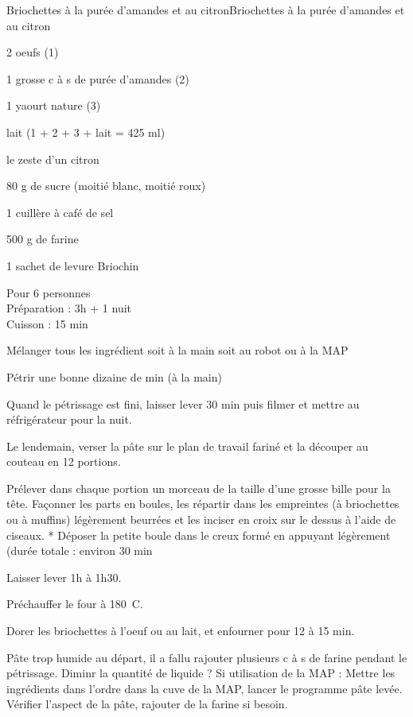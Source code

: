 \begin{recette}{Briochettes à la purée d'amandes et au citron}{Briochettes à la purée d'amandes et au citron}

\begin{ingredients}
2 oeufs (1)\par
1 grosse c à s de purée d'amandes (2)\par
1 yaourt nature (3)\par
lait (1 + 2 + 3 + lait = 425 ml)\par
le zeste d'un citron\par
80 g de sucre (moitié blanc, moitié roux)\par
1 cuillère à café de sel\par
500 g de farine\par
1 sachet de levure Briochin\par
\end{ingredients}

\begin{infos}
Pour 6 personnes\\
Préparation : 3h + 1 nuit\\
Cuisson : 15 min\\
\end{infos}

\begin{etapes}
\item Mélanger tous les ingrédient soit à la main soit au robot ou à la MAP
\item Pétrir une bonne dizaine de min (à la main)
\item Quand le pétrissage est fini, laisser lever 30 min puis filmer et mettre au réfrigérateur pour la nuit.
\item Le lendemain, verser la pâte sur le plan de travail fariné et la découper au couteau en 12 portions.
\item Prélever dans chaque portion un morceau de la taille d'une grosse bille pour la tête. Façonner les parts en boules, les répartir dans les empreintes (à briochettes ou à muffins) légèrement beurrées et les inciser en croix sur le dessus à l'aide de ciseaux. * Déposer la petite boule dans le creux formé en appuyant légèrement (durée totale : environ 30 min
\item Laisser lever 1h à 1h30.
\item Préchauffer le four à 180\ C.
\item Dorer les briochettes à l'oeuf ou au lait, et enfourner pour 12 à 15 min.
\end{etapes}

\begin{conseils}
Pâte trop humide au départ, il a fallu rajouter plusieurs c à s de farine pendant le pétrissage. Diminr la quantité de liquide ?
Si utilisation de la MAP : Mettre les ingrédients dans l'ordre dans la cuve de la MAP, lancer le programme pâte levée. Vérifier l'aspect de la pâte, rajouter de la farine si besoin.
\end{conseils}

\end{recette}